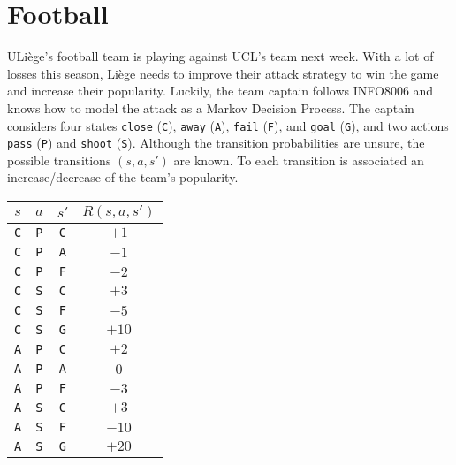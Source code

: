 \documentclass[11pt, a4paper]{article}
\begin{document}
\begin{enumerate}
\begin{solution}
    \end{solution}
\end{enumerate}

\newpage

\section{Football}

\def\C{\texttt{C}}
\def\A{\texttt{A}}
\def\F{\texttt{F}}
\def\G{\texttt{G}}
\def\P{\texttt{P}}
\def\S{\texttt{S}}

ULiège's football team is playing against UCL's team next week. With a lot of losses this season, Liège needs to improve their attack strategy to win the game and increase their popularity. Luckily, the team captain follows INFO8006 and knows how to model the attack as a Markov Decision Process. The captain considers four states \texttt{close} (\C), \texttt{away} (\A), \texttt{fail} (\F), and \texttt{goal} (\G), and two actions \texttt{pass} (\P) and \texttt{shoot} (\S). Although the transition probabilities are unsure, the possible transitions $(s, a, s')$ are known. To each transition is associated an increase/decrease of the team's popularity.

\begin{table}[h]
    \centering
    \begin{tabular}{ccc|c}
        \toprule
         $s$ & $a$ & $s'$ & $R(s, a, s')$ \\
         \midrule
         \C & \P & \C & $+1$ \\
         \C & \P & \A & $-1$ \\
         \C & \P & \F & $-2$ \\
         \C & \S & \C & $+3$ \\
         \C & \S & \F & $-5$ \\
         \C & \S & \G & $+10$ \\
         \midrule
         \A & \P & \C & $+2$ \\
         \A & \P & \A & $0$ \\
         \A & \P & \F & $-3$ \\
         \A & \S & \C & $+3$ \\
         \A & \S & \F & $-10$ \\
         \A & \S & \G & $+20$ \\
         \bottomrule
    \end{tabular}
\end{table}
\end{document}

